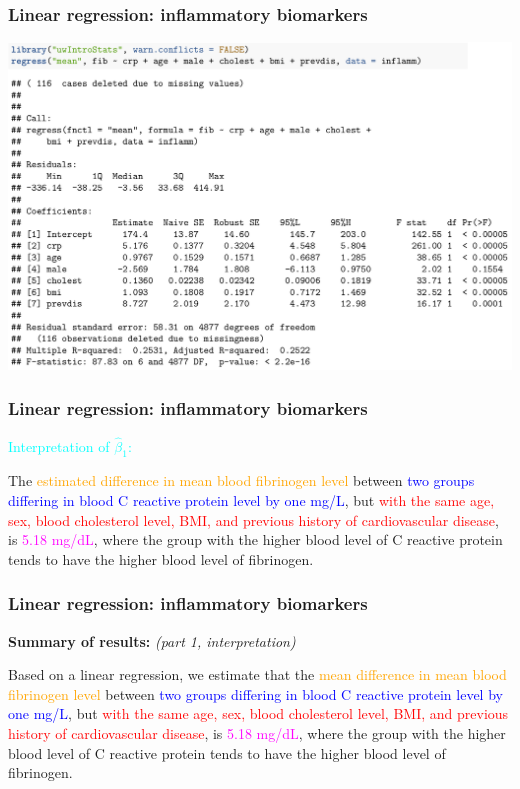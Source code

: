 \documentclass[12pt, 
hyperref={colorlinks=true, linkcolor=blue, urlcolor=cyan},dvipsnames]{beamer}
\begin{document}
\begin{frame}
\frametitle{Linear regression: inflammatory biomarkers}
\hspace*{-0.5cm}\includegraphics[width = 1.1\textwidth]{plots/inflamm_fib_vs_crp.png}
\end{frame}

\begin{frame}
\frametitle{Linear regression: inflammatory biomarkers}\textcolor{cyan}{Interpretation of $\hat{\beta}_1$:} 

The \textcolor{orange}{estimated difference in mean blood fibrinogen level} between \textcolor{blue}{two groups differing in blood C reactive protein level by one mg/L}, but \textcolor{red}{with the same age, sex, blood cholesterol level, BMI, and previous history of cardiovascular disease}, is \textcolor{magenta}{5.18 mg/dL}, where the group with the higher blood level of C reactive protein tends to have the higher blood level of fibrinogen.
\end{frame}

\begin{frame}
\frametitle{Linear regression: inflammatory biomarkers}

\textbf{Summary of results:} \textit{(part 1, interpretation)}

Based on a linear regression, we estimate that the \textcolor{orange}{mean difference in mean blood fibrinogen level} between \textcolor{blue}{two groups differing in blood C reactive protein level by one mg/L}, but \textcolor{red}{with the same age, sex, blood cholesterol level, BMI, and previous history of cardiovascular disease}, is \textcolor{magenta}{5.18 mg/dL}, where the group with the higher blood level of C reactive protein tends to have the higher blood level of fibrinogen. 
\end{frame}
\end{document}

